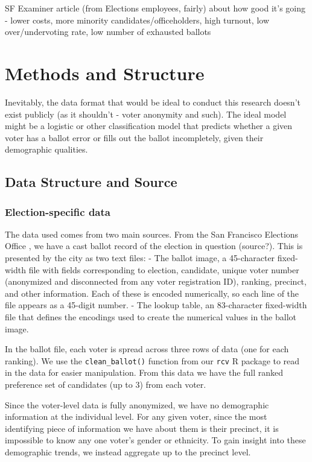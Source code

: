 \documentclass[12pt,twoside]{reedthesis}
\theoremstyle{definition}
\theoremstyle{definition}
\theoremstyle{definition}
\theoremstyle{remark}
\begin{document}
SF Examiner article (from Elections employees, fairly) about how good
it's going - lower costs, more minority candidates/officeholders, high
turnout, low over/undervoting rate, low number of exhausted ballots

\hypertarget{methods}{%
\chapter{Methods and Structure}\label{methods}}

Inevitably, the data format that would be ideal to conduct this research
doesn't exist publicly (as it shouldn't - voter anonymity and such). The
ideal model might be a logistic or other classification model that
predicts whether a given voter has a ballot error or fills out the
ballot incompletely, given their demographic qualities.

\hypertarget{data-structure-and-source}{%
\section{Data Structure and Source}\label{data-structure-and-source}}

\hypertarget{election-specific-data}{%
\subsection{Election-specific data}\label{election-specific-data}}

The data used comes from two main sources. From the San Francisco
Elections Office , we have a cast ballot record of the election in
question (source?). This is presented by the city as two text files: -
The ballot image, a 45-character fixed-width file with fields
corresponding to election, candidate, unique voter number (anonymized
and disconnected from any voter registration ID), ranking, precinct, and
other information. Each of these is encoded numerically, so each line of
the file appears as a 45-digit number. - The lookup table, an
83-character fixed-width file that defines the encodings used to create
the numerical values in the ballot image.

In the ballot file, each voter is spread across three rows of data (one
for each ranking). We use the \texttt{clean\_ballot()} function from our
\texttt{rcv} R package to read in the data for easier manipulation. From
this data we have the full ranked preference set of candidates (up to 3)
from each voter.

Since the voter-level data is fully anonymized, we have no demographic
information at the individual level. For any given voter, since the most
identifying piece of information we have about them is their precinct,
it is impossible to know any one voter's gender or ethnicity. To gain
insight into these demographic trends, we instead aggregate up to the
precinct level.
\end{document}
